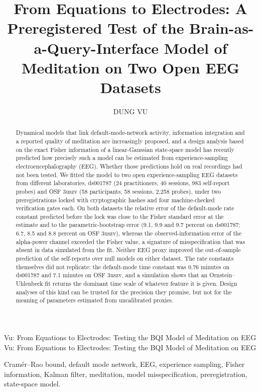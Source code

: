 
\title{From Equations to Electrodes: A Preregistered Test of the Brain-as-a-Query-Interface Model of Meditation on Two Open EEG Datasets}
\author{\uppercase{Dung Vu}}
\address[1]{Phenikaa University, Hanoi 12116, Vietnam (e-mail: [institutional e-mail])}

\markboth
{Vu: From Equations to Electrodes: Testing the BQI Model of Meditation on EEG}
{Vu: From Equations to Electrodes: Testing the BQI Model of Meditation on EEG}


\begin{abstract}
Dynamical models that link default-mode-network activity, information integration and a reported quality of meditation are increasingly proposed, and a design analysis based on the exact Fisher information of a linear-Gaussian state-space model has recently predicted how precisely such a model can be estimated from experience-sampling electroencephalography (EEG). Whether those predictions hold on real recordings had not been tested. We fitted the model to two open experience-sampling EEG datasets from different laboratories, ds001787 (24 practitioners, 40 sessions, 983 self-report probes) and OSF 3uszv (58 participants, 58 sessions, 2,258 probes), under two preregistrations locked with cryptographic hashes and four machine-checked verification gates each. On both datasets the relative error of the default-mode rate constant predicted before the lock was close to the Fisher standard error at the estimate and to the parametric-bootstrap error (9.1, 9.9 and 9.7 percent on ds001787; 6.7, 8.5 and 8.8 percent on OSF 3uszv), whereas the observed-information error of the alpha-power channel exceeded the Fisher value, a signature of misspecification that was absent in data simulated from the fit. Neither EEG proxy improved the out-of-sample prediction of the self-reports over null models on either dataset. The rate constants themselves did not replicate: the default-mode time constant was 0.76 minutes on ds001787 and 7.1 minutes on OSF 3uszv, and a simulation shows that an Ornstein--Uhlenbeck fit returns the dominant time scale of whatever feature it is given. Design analyses of this kind can be trusted for the precision they promise, but not for the meaning of parameters estimated from uncalibrated proxies.
\end{abstract}

\begin{keywords}
Cram\'er--Rao bound, default mode network, EEG, experience sampling, Fisher information, Kalman filter, meditation, model misspecification, preregistration, state-space model.
\end{keywords}

\titlepgskip=-21pt

\maketitle
